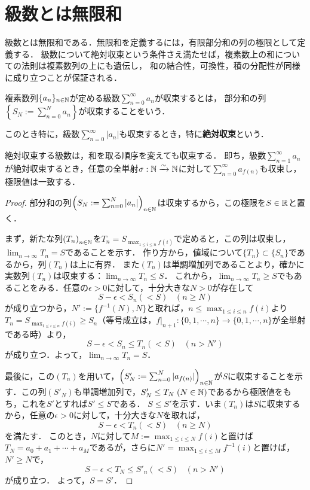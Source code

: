 \documentclass[uplatex, dvipdfmx]{jsreport}
\begin{document}
\section{級数とは無限和}

\begin{screen}
    級数とは無限和である．無限和を定義するには，有限部分和の列の極限として定義する．
    級数について絶対収束という条件さえ満たせば，複素数上の和についての法則は複素数列の上にも遺伝し，
    和の結合性，可換性，積の分配性が同様に成り立つことが保証される．
\end{screen}

\begin{definition}[級数の収束]
    複素数列$\{a_n\}_{n\in\mathbb{N}}$が定める級数$\sum_{n=0}^\infty a_n$が収束するとは，
    部分和の列$\left\{S_N:=\sum^N_{n=0}a_n\right\}$が収束することをいう．

    このとき特に，級数$\sum^\infty_{n=0}|a_n|$も収束するとき，特に\textbf{絶対収束}という．
\end{definition}

\begin{proposition}[和の可換性]
    絶対収束する級数は，和を取る順序を変えても収束する．
    即ち，級数$\sum^\infty_{n=1}a_n$が絶対収束するとき，任意の全単射$\sigma:\mathbb{N}\xrightarrow{\sim}\mathbb{N}$に対して$\sum^\infty_{n=0}a_{f(n)}$も収束し，極限値は一致する．
\end{proposition}
\begin{proof}
    部分和の列$\left(S_N:=\sum^N_{n=0}|a_n|\right)_{n\in\mathbb{N}}$は収束するから，この極限を$S\in\mathbb{R}$と置く．

    まず，新たな列$\left(T_n\right)_{n\in\mathbb{N}}$を$T_n=S_{\max_{1\le i\le n}f(i)}$で定めると，この列は収束し，$\lim_{n\to\infty}T_n=S$であることを示す．
    作り方から，値域について$\{T_n\}\subset\{S_n\}$であるから，列$(T_n)$は上に有界．
    また$(T_n)$は単調増加列であることより，確かに実数列$(T_n)$は収束する：$\lim_{n\to\infty}T_n\le S$．
    これから，$\lim_{n\to\infty}T_n\ge S$でもあることをみる．任意の$\epsilon>0$に対して，十分大きな$N>0$が存在して
    \[ S-\epsilon<S_n(<S)\;\;\;(n\ge N) \]
    が成り立つから，$N':=\{f^{-1}(N),N\}$と取れば，$n\le \max_{1\le i\le n}f(i)$より$T_n=S_{\max_{1\le i\le n}f(i)}\ge S_n$（等号成立は，$f|_{n+1}:\{0,1,\cdots,n\}\to\{0,1,\cdots,n\}$が全単射である時）より，
    \[S-\epsilon<S_n\le T_n(<S)\;\;\;(n>N')\]
    が成り立つ．よって，$\lim_{n\to\infty}T_n=S$．

    最後に，この$(T_n)$を用いて，$\left(S'_N:=\sum^N_{n=0}|a_{f(n)}|\right)_{n\in\mathbb{N}}$が$S$に収束することを示す．この列$(S'_N)$も単調増加列で，$S'_N\le T_N\;(N\in\mathbb{N})$であるから極限値をもち，これを$S'$とすれば$S'\le S$である．
    $S\le S'$を示す．いま$(T_n)$は$S$に収束するから，任意の$\epsilon>0$に対して，十分大きな$N$を取れば，
    \[S-\epsilon<T_n(<S)\;\;\;(n\ge N)\]
    を満たす．
    このとき，$N$に対して$M:=\max_{1\le i\le N}f(i)$と置けば$T_N=a_0+a_1+\cdots+a_M$であるが，さらに$N'=\max_{1\le i\le M}f^{-1}(i)$と置けば，$N'\ge N$で，
    \[S-\epsilon<T_N\le S'_n(<S)\;\;\;(n>N')\]
    が成り立つ．
    よって，$S=S'$．
\end{proof}
\end{document}
